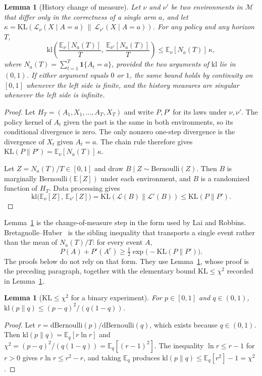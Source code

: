 \documentclass{article}
\newtheorem{lemma}[theorem]{Lemma}
\theoremstyle{definition}
\theoremstyle{remark}
\newcommand{\E}{\mathbb{E}}
\newcommand{\kl}{\mathrm{kl}}
\newcommand{\KL}{\mathrm{KL}}
\begin{document}
\begin{lemma}[History change of measure]\label{lem:com}
Let $\nu$ and $\nu'$ be two environments in $\mathcal M$ that differ only in the correctness of a single arm $a$, and let $\kappa=\KL(\mathcal L_\nu(X\mid A=a)\,\|\,\mathcal L_{\nu'}(X\mid A=a))$. For any policy and any horizon $T$,
\[
\kl\!\left(\frac{\E_\nu[N_a(T)]}{T},\,\frac{\E_{\nu'}[N_a(T)]}{T}\right)
\le\E_\nu[N_a(T)]\,\kappa,
\]
where $N_a(T)=\sum_{t=1}^T\mathbf 1\{A_t=a\}$, provided the two arguments of $\kl$ lie in $(0,1)$. If either argument equals $0$ or $1$, the same bound holds by continuity on $[0,1]$ whenever the left side is finite, and the history measures are singular whenever the left side is infinite.
\end{lemma}

\begin{proof}
Let $H_T=(A_1,X_1,\dots,A_T,X_T)$ and write $P,P'$ for its laws under $\nu,\nu'$. The policy kernel of $A_t$ given the past is the same in both environments, so its conditional divergence is zero. The only nonzero one-step divergence is the divergence of $X_t$ given $A_t=a$. The chain rule therefore gives $\KL(P\|P')=\E_\nu[N_a(T)]\,\kappa$.

Let $Z=N_a(T)/T\in[0,1]$ and draw $B\mid Z\sim\mathrm{Bernoulli}(Z)$. Then $B$ is marginally $\mathrm{Bernoulli}(\E[Z])$ under each environment, and $B$ is a randomized function of $H_T$. Data processing gives
\[
\kl\!\big(\E_\nu[Z],\,\E_{\nu'}[Z]\big)
=\KL(\mathcal L(B)\|\mathcal L'(B))
\le\KL(P\|P').
\]
\end{proof}

Lemma~\ref{lem:com} is the change-of-measure step in the form used by Lai and Robbins. Bretagnolle--Huber~\cite{bretagnolle1979} is the sibling inequality that transports a single event rather than the mean of $N_a(T)/T$: for every event $A$,
\[
P(A)+P'(A^c)\ge\tfrac12\exp\!\big(-\KL(P\|P')\big).
\]
The proofs below do not rely on that form. They use Lemma~\ref{lem:com}, whose proof is the preceding paragraph, together with the elementary bound $\KL\le\chi^2$ recorded in Lemma~\ref{lem:chi2}.

\begin{lemma}[$\KL\le\chi^2$ for a binary experiment]\label{lem:chi2}
For $p\in[0,1]$ and $q\in(0,1)$, $\kl(p\|q)\le(p-q)^2/(q(1-q))$.
\end{lemma}

\begin{proof}
Let $r=\mathrm d\mathrm{Bernoulli}(p)/\mathrm d\mathrm{Bernoulli}(q)$, which exists because $q\in(0,1)$. Then $\kl(p\|q)=\E_q[r\ln r]$ and $\chi^2=(p-q)^2/(q(1-q))=\E_q[(r-1)^2]$. The inequality $\ln r\le r-1$ for $r>0$ gives $r\ln r\le r^2-r$, and taking $\E_q$ produces $\kl(p\|q)\le\E_q[r^2]-1=\chi^2$.
\end{proof}
\end{document}
